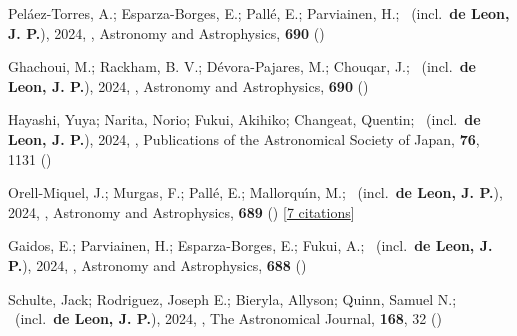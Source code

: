 \item[{\color{numcolor}\scriptsize74}] Pel{\'a}ez-Torres, A.; Esparza-Borges, E.; Pall{\'e}, E.; Parviainen, H.; \etal\ (incl.\ \textbf{de Leon, J. P.}), 2024, , Astronomy and Astrophysics, \textbf{690} ()

\item[{\color{numcolor}\scriptsize73}] Ghachoui, M.; Rackham, B. V.; D{\'e}vora-Pajares, M.; Chouqar, J.; \etal\ (incl.\ \textbf{de Leon, J. P.}), 2024, , Astronomy and Astrophysics, \textbf{690} ()

\item[{\color{numcolor}\scriptsize72}] Hayashi, Yuya; Narita, Norio; Fukui, Akihiko; Changeat, Quentin; \etal\ (incl.\ \textbf{de Leon, J. P.}), 2024, , Publications of the Astronomical Society of Japan, \textbf{76}, 1131 ()

\item[{\color{numcolor}\scriptsize71}] Orell-Miquel, J.; Murgas, F.; Pall{\'e}, E.; Mallorqu{\'\i}n, M.; \etal\ (incl.\ \textbf{de Leon, J. P.}), 2024, , Astronomy and Astrophysics, \textbf{689} () [\href{https://ui.adsabs.harvard.edu/abs/2024A&A...689A.179O}{7 citations}]

\item[{\color{numcolor}\scriptsize70}] Gaidos, E.; Parviainen, H.; Esparza-Borges, E.; Fukui, A.; \etal\ (incl.\ \textbf{de Leon, J. P.}), 2024, , Astronomy and Astrophysics, \textbf{688} ()

\item[{\color{numcolor}\scriptsize69}] Schulte, Jack; Rodriguez, Joseph E.; Bieryla, Allyson; Quinn, Samuel N.; \etal\ (incl.\ \textbf{de Leon, J. P.}), 2024, , The Astronomical Journal, \textbf{168}, 32 ()

